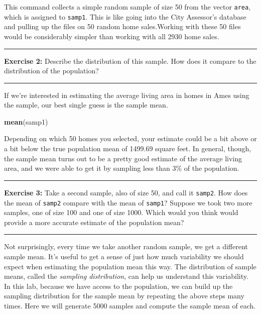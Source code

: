 \documentclass[]{book}
\newenvironment{Shaded}{\begin{snugshade}}{\end{snugshade}}
\newcommand{\KeywordTok}[1]{\textcolor[rgb]{0.13,0.29,0.53}{\textbf{#1}}}
\newcommand{\NormalTok}[1]{#1}
\theoremstyle{definition}
\theoremstyle{definition}
\theoremstyle{definition}
\theoremstyle{remark}
\begin{document}
This command collects a simple random sample of size 50 from the vector
\texttt{area}, which is assigned to \texttt{samp1}. This is like going
into the City Assessor's database and pulling up the files on 50 random
home sales.Working with these 50 files would be considerably simpler
than working with all 2930 home sales.

\begin{center}\rule{0.5\linewidth}{\linethickness}\end{center}

\textbf{Exercise 2:} Describe the distribution of this sample. How does
it compare to the distribution of the population?

\begin{center}\rule{0.5\linewidth}{\linethickness}\end{center}

If we're interested in estimating the average living area in homes in
Ames using the sample, our best single guess is the sample mean.

\begin{Shaded}
\begin{Highlighting}[]
\KeywordTok{mean}\NormalTok{(samp1)}
\end{Highlighting}
\end{Shaded}

Depending on which 50 homes you selected, your estimate could be a bit
above or a bit below the true population mean of 1499.69 square feet. In
general, though, the sample mean turns out to be a pretty good estimate
of the average living area, and we were able to get it by sampling less
than 3\% of the population.

\begin{center}\rule{0.5\linewidth}{\linethickness}\end{center}

\textbf{Exercise 3:} Take a second sample, also of size 50, and call it
\texttt{samp2}. How does the mean of \texttt{samp2} compare with the
mean of \texttt{samp1}? Suppose we took two more samples, one of size
100 and one of size 1000. Which would you think would provide a more
accurate estimate of the population mean?

\begin{center}\rule{0.5\linewidth}{\linethickness}\end{center}

Not surprisingly, every time we take another random sample, we get a
different sample mean. It's useful to get a sense of just how much
variability we should expect when estimating the population mean this
way. The distribution of sample means, called the \emph{sampling
distribution}, can help us understand this variability. In this lab,
because we have access to the population, we can build up the sampling
distribution for the sample mean by repeating the above steps many
times. Here we will generate 5000 samples and compute the sample mean of
each.
\end{document}
